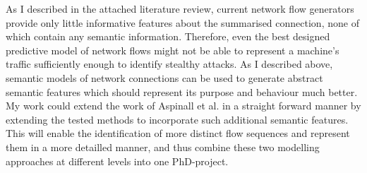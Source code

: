 \documentclass[a4paper,12pt,twoside]{article}
\begin{document}
As I described in the attached literature review, current network flow generators provide only little informative features about the summarised connection, none of which contain any semantic information. Therefore, even the best designed predictive model of network flows might not be able to represent a machine's traffic sufficiently enough to identify stealthy attacks. As I described above, semantic models of network connections can be used to generate abstract semantic features which should represent its purpose and behaviour much better. My work could extend the work of  Aspinall et al. in a straight forward manner by extending the tested methods to incorporate such additional semantic features. This will enable the identification of more distinct flow sequences and represent them in a more detailled manner, and thus combine these two modelling approaches at different levels into one PhD-project.







\end{document}
